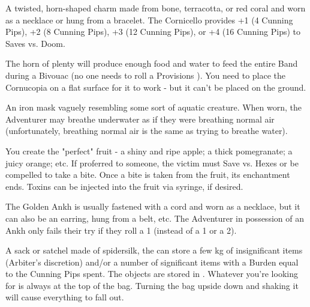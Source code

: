 \MARVELS[
  Name=Cornicello,
  Link=marvels-cornicello,
  Pips=4+
]

A twisted, horn-shaped charm made from bone, terracotta, or red coral and worn as a necklace or hung from a bracelet. The Cornicello provides +1 (4 Cunning Pips), +2 (8 Cunning Pips), +3 (12 Cunning Pips), or +4 (16 Cunning Pips) to Saves vs. Doom.

\cbreak

\MARVELS[
  Name=Cornucopia,
  Link=marvels-cornucopia,
  Pips=4
]

The horn of plenty will produce enough food and water to feed the entire Band during a Bivouac (no one needs to roll a Provisions \UD).  You need to place the Cornucopia on a flat surface for it to work - but it can't be placed on the ground.

\MARVELS[
  Name=Fish Mask,
  Link=marvels-fish-mask,
  Pips=2
]

An iron mask vaguely resembling some sort of aquatic creature.  When worn, the Adventurer may breathe underwater as if they were breathing normal air (unfortunately, breathing normal air is the same as trying to breathe water).


\MARVELS[
  Name=Forbidden Fruit,
  Link=marvels-forbidden-fruit,
  Pips=8
]

You create the "perfect" fruit - a shiny and ripe apple; a thick pomegranate; a juicy orange; etc. If proferred to someone, the victim must Save vs. Hexes or be compelled to take a bite. Once a bite is taken from the fruit, its enchantment ends. Toxins can be injected into the fruit via syringe, if desired.


\MARVELS[
  Name=Golden Ankh,
  Link=marvels-ankh,
  Pips=8
]

The Golden Ankh is usually fastened with a cord and worn as a necklace, but it can also be an earring, hung from a belt, etc. The Adventurer in possession of an Ankh only fails their \DEATH try if they roll a 1 (instead of a 1 or a 2).

\MARVELS[
  Name=Hammerspace Bag,
  Link=marvels-hammerspace-bag,
  Pips=2+
]

A sack or satchel made of spidersilk, the  can store a few kg of insignificant items (Arbiter's discretion) and/or a number of significant items with a Burden equal to the Cunning Pips spent. The objects are stored in . Whatever you're looking for is always at the top of the bag.  Turning the bag upside down and shaking it will cause everything to fall out.

